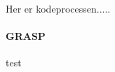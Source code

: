 \documentclass[class=article, crop=false]{standalone}
\begin{document}
    Her er kodeprocessen.....

    \paragraph{GRASP\\}
    test
\end{document}
